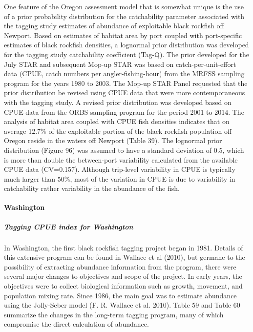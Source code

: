 \documentclass[11pt,
  english,
  letterpaper,
]{article}
\begin{document}
One feature of the Oregon assessment model that is somewhat unique is the use of a prior probability distribution for the catchability parameter associated with the tagging study estimates of abundance of exploitable black rockfish off Newport. Based on estimates of habitat area by port coupled with port-specific estimates of black rockfish densities, a lognormal prior distribution was developed for the tagging study catchability coefficient (Tag-Q). The prior developed for the July STAR and subsequent Mop-up STAR was based on catch-per-unit-effort data (CPUE, catch numbers per angler-fishing-hour) from the MRFSS sampling program for the years 1980 to 2003. The Mop-up STAR Panel requested that the prior distribution be revised using CPUE data that were more contemporaneous with the tagging study. A revised prior distribution was developed based on CPUE data from the ORBS sampling program for the period 2001 to 2014. The analysis of habitat area coupled with CPUE fish densities indicates that on average 12.7\% of the exploitable portion of the black rockfish population off Oregon reside in the waters off Newport (Table 39). The lognormal prior distribution (Figure 96) was assumed to have a standard deviation of 0.5, which is more than double the between-port variability calculated from the available CPUE data (CV=0.157). Although trip-level variability in CPUE is typically much larger than 50\%, most of the variation in CPUE is due to variability in catchability rather variability in the abundance of the fish.

\hypertarget{washington}{%
\paragraph{Washington}\label{washington}}

\hypertarget{tagging-cpue-index-for-washington}{%
\subparagraph{Tagging CPUE index for Washington}\label{tagging-cpue-index-for-washington}}

In Washington, the first black rockfish tagging project began in 1981. Details of this extensive program can be found in Wallace et al (2010), but germane to the possibility of extracting abundance information from the program, there were several major changes to objectives and scope of the project. In early years, the objectives were to collect biological information such as growth, movement, and population mixing rate. Since 1986, the main goal was to estimate abundance using the Jolly-Seber model (F. R. Wallace et al. 2010). Table 59 and Table 60 summarize the changes in the long-term tagging program, many of which compromise the direct calculation of abundance.
\end{document}
